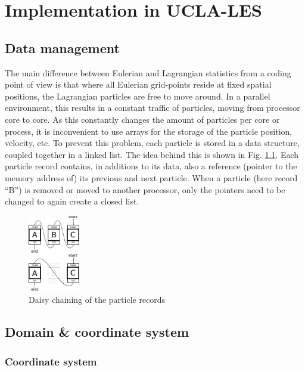 \documentclass[twoside,a4paper]{report}
\begin{document}
\chapter{Implementation in UCLA-LES}

\section{Data management}

The main difference between Eulerian and Lagrangian statistics from a coding point of view is that where all Eulerian grid-points reside at fixed spatial positions, the Lagrangian particles are free to move around. In a parallel environment, this results in a constant traffic of particles, moving from processor core to core. As this constantly changes the amount of particles per core or process, it is inconvenient to use arrays for the storage of the particle position, velocity, etc. To prevent this problem, each particle is stored in a data structure, coupled together in a linked list. The idea behind this is shown in Fig. \ref{fig:linked_list}. Each particle record contains, in additions to its data, also a reference (pointer to the memory address of) its previous and next particle. When a particle (here record ``B'') is removed or moved to another processor, only the pointers need to be changed to again create a closed list. 

\begin{figure}[h]
  \begin{center}
    \includegraphics[width=0.2\textwidth]{figures_LPTM/linked_list.pdf}
    \caption{Daisy chaining of the particle records}
    \label{fig:linked_list}       %
  \end{center}
\end{figure}

\section{Domain \& coordinate system}

\subsection{Coordinate system}
\end{document}
